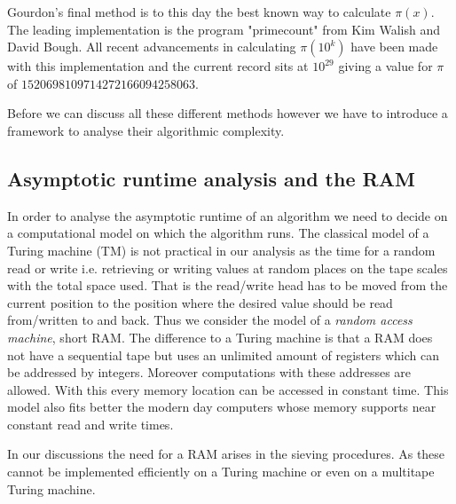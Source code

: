 Gourdon's final method is to this day the best known way to calculate $\pi(x)$.
The leading implementation is the program "primecount" from Kim Walish and David Bough.
All recent advancements in calculating $\pi(10^{k})$ have been made with this implementation
and the current record sits at $10^{29}$ giving a value for $\pi$ of $1520698109714272166094258063$. 

Before we can discuss all these different methods however we have to introduce a framework to analyse their algorithmic complexity.

\subsection{Asymptotic runtime analysis and the RAM}
In order to analyse the asymptotic runtime of an algorithm we need to decide on a computational model on which the algorithm runs.
The classical model of a Turing machine (TM) is not practical in our analysis as the time for a random read or write i.e.
retrieving or writing values at random places on the tape scales with the total space used.
That is the read/write head has to be moved from the current position to the position where the desired value should be read from/written to and back.
Thus we consider the model of a \emph{random access machine}, short RAM.
The difference to a Turing machine is that a RAM does not have a sequential tape but uses
an unlimited amount of registers which can be addressed by integers. Moreover computations with these addresses are allowed.
With this every memory location can be accessed in constant time. This model also fits better the modern day computers
whose memory supports near constant read and write times.

In our discussions the need for a RAM arises in the sieving procedures. As these cannot be implemented
efficiently on a Turing machine or even on a multitape Turing machine.

